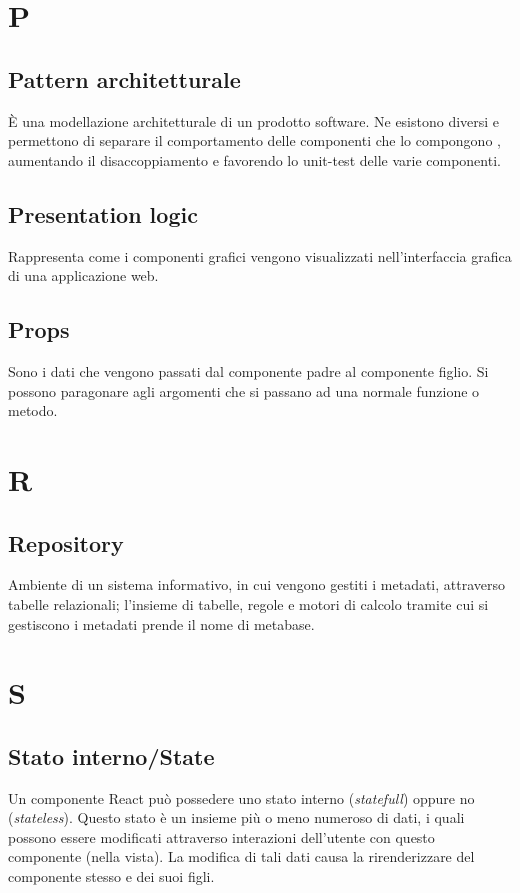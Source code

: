 \section*{P}
\subsection*{Pattern architetturale}
È una modellazione architetturale di un prodotto software. Ne esistono diversi e permettono di separare il comportamento delle componenti che lo compongono , aumentando il disaccoppiamento e favorendo lo unit-test delle varie componenti. 

\subsection*{Presentation logic}
Rappresenta come i componenti grafici vengono visualizzati nell'interfaccia grafica di una applicazione web.

\subsection*{Props}
Sono i dati che vengono passati dal componente padre al componente figlio. Si possono paragonare agli argomenti che si passano 
ad una normale funzione o metodo.


\section*{R}
\subsection*{Repository}
Ambiente di un sistema informativo, in cui vengono gestiti i metadati, attraverso tabelle relazionali; l'insieme di tabelle, regole e motori di calcolo tramite cui si gestiscono i metadati prende il nome di metabase.

\section*{S}
\subsection*{Stato interno/State}
Un componente React può possedere uno stato interno (\textit{statefull}) oppure no (\textit{stateless}). Questo stato è un insieme più o meno numeroso di dati, i quali possono essere modificati attraverso interazioni dell'utente con questo componente (nella vista). La modifica di tali dati causa la rirenderizzare del componente stesso e dei suoi figli. 

